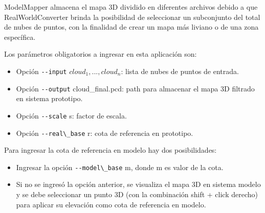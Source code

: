ModelMapper almacena el mapa 3D dividido en diferentes archivos debido a que RealWorldConverter brinda la posibilidad de seleccionar un subconjunto del total de nubes de puntos, con la finalidad de crear un mapa más liviano o de una zona específica. 

Los parámetros obligatorios a ingresar en esta aplicación son:

\begin{itemize}
\item Opción \verb|--input| $cloud_{1}, ..., cloud_{n}$: lista de nubes de puntos de entrada.

\item Opción \verb|--output| cloud\_final.pcd: path para almacenar el mapa 3D filtrado en sistema prototipo.

\item Opción \verb|--scale| s: factor de escala.

\item Opción \verb|--real\_base| r: cota de referencia en prototipo.

\end{itemize}

Para ingresar la cota de referencia en modelo hay dos posibilidades: 
\begin{itemize}

\item Ingresar la opción \verb|--model\_base| m, donde m es valor de la cota.

\item Si no se ingresó la opción anterior, se visualiza el mapa 3D en sistema modelo y se debe seleccionar un punto 3D (con la combinación shift + click derecho) para aplicar su elevación como cota de referencia en modelo.

\end{itemize}



